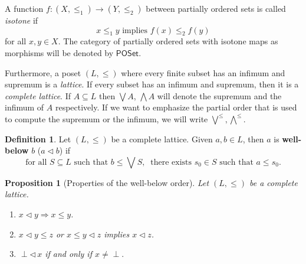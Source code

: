\documentclass[11pt,a4paper]{amsart}
\newtheorem{proposition}[theorem]{Proposition}
\theoremstyle{definition}
\newtheorem{definition}[theorem]{Definition}
\begin{document}
	A function $f:(X,\leq_1)\to (Y,\leq_2)$ between partially ordered sets is called \emph{isotone} if
	$$x\leq_1 y\text{ implies }f(x)\leq_2 f(y)$$
	for all $x,y\in X.$ The category of partially ordered sets with isotone maps as morphisms will be denoted by $\mathsf{POSet}.$
	
	
	Furthermore, a poset $(L,\leq)$ where every finite subset has an infimum and supremum is a \emph{lattice}. If every subset has an infimum and supremum, then it is a \emph{complete lattice}. If $A\subseteq L$ then $\bigvee A$, $\bigwedge A$ will denote the supremum and the infimum of $A$ respectively. If we want to emphasize the partial order that is used to compute the supremum or the infimum, we will write $\overset{{\scriptscriptstyle \leq}}{\bigvee},\overset{{\scriptscriptstyle\leq}}{\bigwedge}.$
	
	
	\begin{definition}\label{def: well below}
		Let $(L,\leq)$ be a complete lattice. Given $a,b\in L$, then $a$ is \textbf{well-below} $b$ ($a\lhd b$) if
		$$\text{for all } S\subseteq L\text{ such that }b\leq\bigvee S,\ \text{ there exists } s_0\in S\text{ such that } a\leq s_0.$$
	\end{definition}
	
	
	
	
	
	
	\begin{proposition}[Properties of the well-below order]\label{lema: well below}
		Let $(L,\leq)$ be a complete lattice.
		\begin{enumerate}
			\item $x\lhd y\Rightarrow x\leq y$.
			\item $x\lhd y\leq z$ or $x\leq y\lhd z$ implies $x\lhd z$.
			\item $\perp\lhd\, x$ if and only if $x\neq\perp.$
		\end{enumerate}
	\end{proposition}
	
	
	
\end{document}
